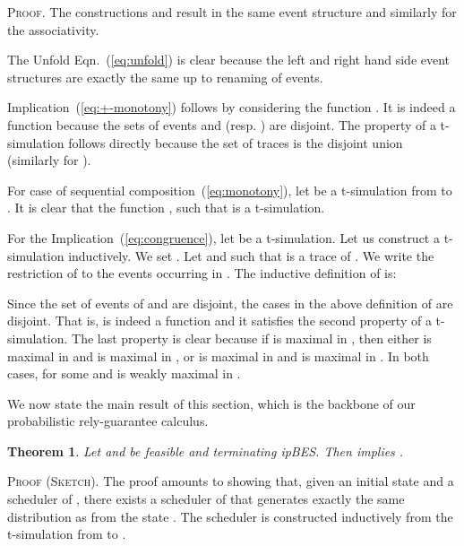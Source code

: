 \documentclass[review]{elsart}
\newtheorem{theorem}[definition]{Theorem}
\newenvironment{proof}{\par
\noindent
\textsc{Proof. }
\noindent}{\hfill}
\newenvironment{proofsummary}{\par
\noindent
\textsc{Proof (Sketch). }
\noindent}{\hfill}
\newcommand{\Eqn}[1]{Eqn.~(\ref{#1})}
\begin{document}
\begin{proof}
The constructions  and  result in the same event structure and similarly for the associativity. 



The Unfold \Eqn{eq:unfold} is clear because the left and right hand side event structures are exactly the same up to renaming of events.

Implication~(\ref{eq:+-monotony}) follows by considering the function . It is indeed a function because the sets of events  and  (resp. ) are disjoint. The property of a t-simulation follows directly because the set of traces  is the disjoint union  (similarly for ).

For case of sequential composition~(\ref{eq:monotony}), let  be a t-simulation from  to . It is clear that the function , such that  is a t-simulation.

For the Implication~(\ref{eq:congruence}), let  be a t-simulation. Let us construct a t-simulation  inductively. We set . Let  and  such that  is a trace of . We write  the restriction of  to the events occurring in . The inductive definition of  is:

Since the set of events of  and  are disjoint, the cases in the above definition of  are disjoint. That is,  is indeed a function and it satisfies the second property of a t-simulation. The last property is clear because if  is maximal in , then either  is maximal in  and  is maximal in , or  is maximal in  and  is maximal in . In both cases,  for some  and  is weakly maximal in .
\end{proof}

We now state the main result of this section, which is the backbone of our probabilistic rely-guarantee calculus. 


\begin{theorem}\label{thm:trace-imply-distribution}
Let  and  be feasible and terminating ipBES. Then  implies .
\end{theorem}

\begin{proofsummary}
The proof amounts to showing that, given an initial state  and a scheduler  of , there exists a scheduler  of  that generates exactly the same distribution as  from the state . The scheduler  is  constructed  inductively from the t-simulation from  to . 
\end{proofsummary}
\end{document}
